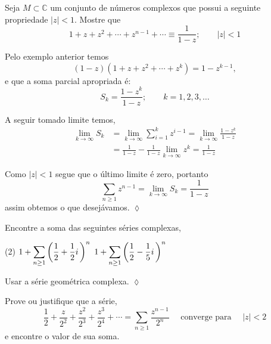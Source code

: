 \begin{exer}
Seja $M\subset \mathbb{C}$ um conjunto de n\'{u}meros complexos que
possui a seguinte propriedade $|z|<1$.
 Mostre que
\begin{equation*}
  1+z+z^2+\cdots+z^{n-1}+\cdots\equiv \frac{1}{1-z};\qquad |z|<1
\end{equation*}
\end{exer}

\solo Pelo exemplo anterior temos
\begin{equation*}
    (1-z)(1+z+z^2+\cdots+z^k)=1-z^{k-1},
\end{equation*}
e que a soma parcial apropriada \'{e}:
\begin{equation*}
  S_k=\frac{1-z^k}{1-z};\qquad k=1,2,3,\ldots
\end{equation*}

A seguir tomado limite temos,
\begin{align*}
  \lim_{k\to\infty}S_k&=\lim_{k\to\infty}\sum_{i=1}^{k}z^{i-1}
  =\lim_{k\to\infty}\frac{1-z^k}{1-z}\\[2ex]
  &=\frac{1}{1-z}-\frac{1}{1-z}\lim_{k\to\infty}z^k=\frac{1}{1-z}
\end{align*}

 Como $|z|<1$ segue que o \'{u}ltimo limite \'{e} zero, portanto
\begin{equation*}
  \sum_{n\geq 1}z^{n-1}=\lim_{k\to\infty}S_k=\frac{1}{1-z}
\end{equation*}
assim obtemos o que desej\'{a}vamos. \hfill \(\lozenge\)

\begin{exer}
Encontre a soma das seguintes s\'{e}ries complexas,
\begin{tasks}[label=(\alph*),item-indent=4em,label-width=4ex,ref=(\alph*)](2)
\task \(\displaystyle 1+\sum_{n\ge 1}\left(\frac{1}{2}+\frac{1}{2}i\, \right)^n\)
\task \(\displaystyle 1+\sum_{n\ge 1}\left(\frac{1}{2}-\frac{1}{5}i\, \right)^n\)
\end{tasks}
\end{exer}

\solo  Usar a série geométrica complexa. \hfill \(\lozenge\)

\begin{exer}
   Prove ou justifique que a s\'{e}rie,
\begin{equation*}
\frac{1}{2}+\frac{z}{2^2}+\frac{z^2}{2^3}+\frac{z^3}{2^4}+\cdots=
\sum_{n \geq 1}\frac{z^{n-1}}{2^n}\quad \text{ converge para  } \quad |z|<2
\end{equation*}
e encontre o valor de sua soma.
\end{exer}

